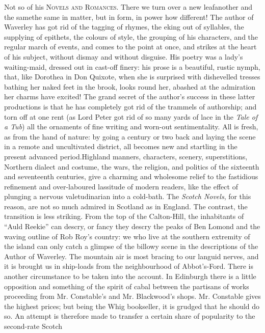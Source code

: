 Not so of his \textsc{Novels and Romances}. There we turn over a new
leaf\textemdash another and the same\textemdash the same in matter, but in form, in
power how different! The author of Waverley has got rid of the
tagging of rhymes, the eking out of syllables, the supplying of
epithets, the colours of style, the grouping of his characters,
and the regular march of events, and comes to the point at once,
and strikes at the heart of his subject, without dismay and
without disguise. His poetry was a lady's waiting-maid, dressed
out in cast-off finery: his prose is a beautiful, rustic nymph,
that, like Dorothea in Don Quixote, when she is surprised with
dishevelled tresses bathing her naked feet in the brook, looks
round her, abashed at the admiration her charms have excited! The
grand secret of the author's success in these latter productions
is that he has completely got rid of the trammels of authorship;
and torn off at one rent (as Lord Peter got rid of so many yards
of lace in the \emph{Tale of a Tub}) all the ornaments of fine writing
and worn-out sentimentality.  All is fresh, as from the hand of
nature: by going a century or two back and laying the scene in a
remote and uncultivated district, all becomes new and startling in
the present advanced period.\textemdash Highland manners, characters,
scenery, superstitions, Northern dialect and costume, the wars,
the religion, and politics of the sixteenth and seventeenth
centuries, give a charming and wholesome relief to the fastidious
refinement and over-laboured lassitude of modern readers, like
the effect of plunging a nervous valetudinarian into a
cold-bath. The \emph{Scotch Novels}, for this reason, are not so much
admired in Scotland as in England. The contrast, the transition is
less striking. From the top of the Calton-Hill, the inhabitants of
``Auld Reekie'' can descry, or fancy they descry the peaks of Ben
Lomond and the waving outline of Rob Roy's country: we who live at
the southern extremity of the island can only catch a glimpse of
the billowy scene in the descriptions of the Author of
Waverley. The mountain air is most bracing to our languid nerves,
and it is brought us in ship-loads from the neighbourhood of
Abbot's-Ford. There is another circumstance to be taken into the
account. In Edinburgh there is a little opposition and something
of the spirit of cabal between the partisans of works proceeding
from Mr.  Constable's and Mr. Blackwood's shops. Mr. Constable
gives the highest prices; but being the Whig bookseller, it is
grudged that he should do so. An attempt is therefore made to
transfer a certain share of popularity to the second-rate Scotch
